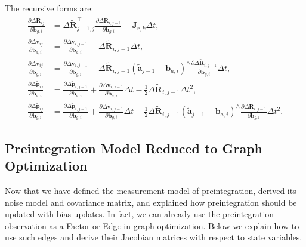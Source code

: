 The recursive forms are:
\begin{subequations}\label{eq:preinteg-jacob-bias-inc}
	\begin{align}
		\frac{\partial \Delta \tilde{\mathbf{R}}_{ij}}{\partial \mathbf{b}_{g,i}} &= \Delta \tilde{\mathbf{R}}_{j-1, 
			j}^\top \frac{\partial \Delta \tilde{\mathbf{R}}_{i,j-1}}{\partial \mathbf{b}_{g,i}} - \mathbf{J}_{r,k} \Delta 
		t, \\
		\frac{\partial \Delta \tilde{\mathbf{v}}_{ij}}{\partial \mathbf{b}_{a,i}} &= \frac{\partial \Delta 
			\tilde{\mathbf{v}}_{i, j-1}}{\partial \mathbf{b}_{a,i}} - \Delta \tilde{\mathbf{R}}_{i, j-1} \Delta t, \\ 
		\frac{\partial \Delta \tilde{\mathbf{v}}_{ij}}{\partial \mathbf{b}_{g,i}} &= \frac{\partial \Delta 
			\tilde{\mathbf{v}}_{i, j-1}}{\partial \mathbf{b}_{g,i}} - \Delta \tilde{\mathbf{R}}_{i, j-1} \left( \tilde{\mathbf{a}}_{j-1} 
		- \mathbf{b}_{a,i} \right)^\wedge \frac{\partial \Delta \tilde{\mathbf{R}}_{i,j-1}}{\partial \mathbf{b}_{g,i}} 
		\Delta t, \\
		\frac{\partial \Delta \tilde{\mathbf{p}}_{ij}}{\partial \mathbf{b}_{a,i}} &= \frac{\partial \Delta 
			\tilde{\mathbf{p}}_{i,j-1}}{\partial \mathbf{b}_{a,i}} + \frac{\partial \Delta \tilde{\mathbf{v}}_{i,j-1}}{\partial 
			\mathbf{b}_{a,i}}  \Delta t- \frac{1}{2} \Delta \tilde{\mathbf{R}}_{i, j-1} \Delta t^2, \\
		\frac{\partial \Delta \tilde{\mathbf{p}}_{ij}}{\partial \mathbf{b}_{g,i}} &= \frac{\partial \Delta 
			\tilde{\mathbf{p}}_{i,j-1}}{\partial \mathbf{b}_{g,i}} + \frac{\partial \Delta \tilde{\mathbf{v}}_{i,j-1}}{\partial 
			\mathbf{b}_{g,i}} \Delta t -\frac{1}{2} \Delta \tilde{\mathbf{R}}_{i, 
			j-1}\left(\tilde{\mathbf{a}}_{j-1}-\mathbf{b}_{a,i}\right)^\wedge  \frac{\partial \Delta 
			\tilde{\mathbf{R}}_{i,j-1}}{\partial \mathbf{b}_{g,i}} \Delta t^2. 
	\end{align}
\end{subequations}

\subsection{Preintegration Model Reduced to Graph Optimization}
\label{subsec:4.1.5}
Now that we have defined the measurement model of preintegration, derived its noise model and covariance matrix, and explained how preintegration should be updated with bias updates. In fact, we can already use the preintegration observation as a Factor or Edge in graph optimization. Below we explain how to use such edges and derive their Jacobian matrices with respect to state variables.

